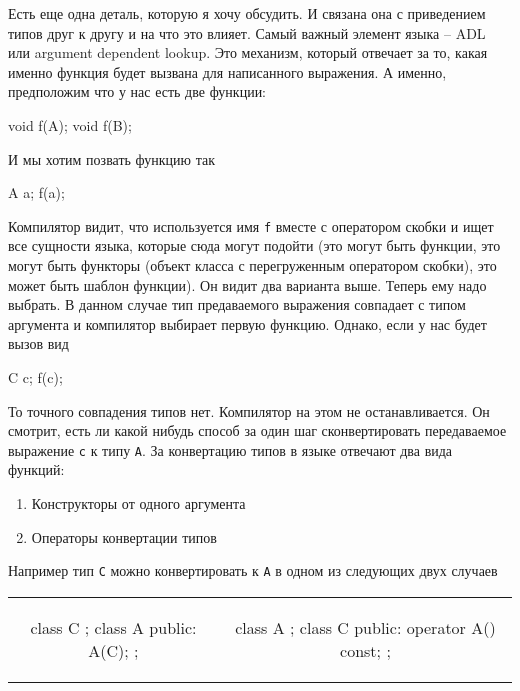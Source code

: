 Есть еще одна деталь, которую я хочу обсудить.
И связана она с приведением типов друг к другу и на что это влияет.
Самый важный элемент языка -- ADL или argument dependent lookup.
Это механизм, который отвечает за то, какая именно функция будет вызвана для написанного выражения.
А именно, предположим что у нас есть две функции:
\begin{cppcode}
void f(A);
void f(B);
\end{cppcode}
И мы хотим позвать функцию так
\begin{cppcode}
A a;
f(a);
\end{cppcode}
Компилятор видит, что используется имя \verb"f" вместе с оператором скобки и ищет все сущности языка, которые сюда могут подойти (это могут быть функции, это могут быть функторы (объект класса с перегруженным оператором скобки), это может быть шаблон функции).
Он видит два варианта выше.
Теперь ему надо выбрать.
В данном случае тип предаваемого выражения совпадает с типом аргумента и компилятор выбирает первую функцию.
Однако, если у нас будет вызов вид
\begin{cppcode}
C c;
f(c);
\end{cppcode}
То точного совпадения типов нет.
Компилятор на этом не останавливается.
Он смотрит, есть ли какой нибудь способ за один шаг сконвертировать передаваемое выражение \verb"c" к типу \verb"A".
За конвертацию типов в языке отвечают два вида функций:
\begin{enumerate}
\item Конструкторы от одного аргумента

\item Операторы конвертации типов
\end{enumerate}
Например тип \verb"C" можно конвертировать к \verb"A" в одном из следующих двух случаев
\begin{center}
\begin{tabular}{cc}
{
\begin{minipage}[\baselineskip]{5.5cm}
\begin{cppcode}[numbers = none]
class C {};
class A {
public:
  A(C);
};
\end{cppcode}
\end{minipage}
}&{
\begin{minipage}[\baselineskip]{5.5cm}
\begin{cppcode}[numbers = none]
class A {};
class C {
public:
  operator A() const;
};
\end{cppcode}
\end{minipage}
}
\end{tabular}
\end{center}
